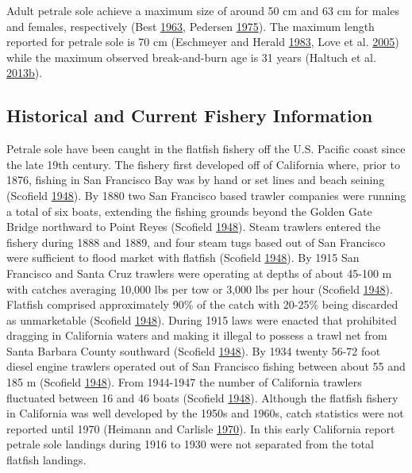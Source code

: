 \documentclass[12pt,]{article}
\begin{document}
Adult petrale sole achieve a maximum size of around 50 cm and 63 cm for
males and females, respectively (Best
\protect\hyperlink{ref-best_e.a._movements_1963}{1963}, Pedersen
\protect\hyperlink{ref-pedersen_movements_1975}{1975}). The maximum
length reported for petrale sole is 70 cm (Eschmeyer and Herald
\protect\hyperlink{ref-eschmeyer_field_1983}{1983}, Love et al.
\protect\hyperlink{ref-love_milton_resource_2005}{2005}) while the
maximum observed break-and-burn age is 31 years (Haltuch et al.
\protect\hyperlink{ref-haltuch_status_2013}{2013}\protect\hyperlink{ref-haltuch_status_2013}{b}).

\subsection{Historical and Current Fishery
Information}\label{historical-and-current-fishery-information}

Petrale sole have been caught in the flatfish fishery off the U.S.
Pacific coast since the late 19th century. The fishery first developed
off of California where, prior to 1876, fishing in San Francisco Bay was
by hand or set lines and beach seining (Scofield
\protect\hyperlink{ref-scofield_trawling_1948}{1948}). By 1880 two San
Francisco based trawler companies were running a total of six boats,
extending the fishing grounds beyond the Golden Gate Bridge northward to
Point Reyes (Scofield
\protect\hyperlink{ref-scofield_trawling_1948}{1948}). Steam trawlers
entered the fishery during 1888 and 1889, and four steam tugs based out
of San Francisco were sufficient to flood market with flatfish (Scofield
\protect\hyperlink{ref-scofield_trawling_1948}{1948}). By 1915 San
Francisco and Santa Cruz trawlers were operating at depths of about
45-100 m with catches averaging 10,000 lbs per tow or 3,000 lbs per hour
(Scofield \protect\hyperlink{ref-scofield_trawling_1948}{1948}).
Flatfish comprised approximately 90\% of the catch with 20-25\% being
discarded as unmarketable (Scofield
\protect\hyperlink{ref-scofield_trawling_1948}{1948}). During 1915 laws
were enacted that prohibited dragging in California waters and making it
illegal to possess a trawl net from Santa Barbara County southward
(Scofield \protect\hyperlink{ref-scofield_trawling_1948}{1948}). By 1934
twenty 56-72 foot diesel engine trawlers operated out of San Francisco
fishing between about 55 and 185 m (Scofield
\protect\hyperlink{ref-scofield_trawling_1948}{1948}). From 1944-1947
the number of California trawlers fluctuated between 16 and 46 boats
(Scofield \protect\hyperlink{ref-scofield_trawling_1948}{1948}).
Although the flatfish fishery in California was well developed by the
1950s and 1960s, catch statistics were not reported until 1970 (Heimann
and Carlisle \protect\hyperlink{ref-heimann_pacific_1970}{1970}). In
this early California report petrale sole landings during 1916 to 1930
were not separated from the total flatfish landings.
\end{document}
